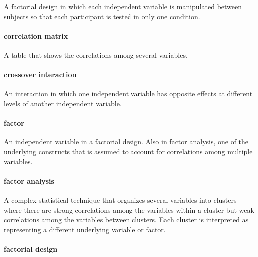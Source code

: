 \documentclass[
]{krantz}
\begin{document}
A factorial design in which each independent variable is manipulated between subjects so that each participant is tested in only one condition.

\hypertarget{correlation-matrix}{%
\paragraph*{correlation matrix}\label{correlation-matrix}}

A table that shows the correlations among several variables.

\hypertarget{crossover-interaction}{%
\paragraph*{crossover interaction}\label{crossover-interaction}}

An interaction in which one independent variable has opposite effects at different levels of another independent variable.

\hypertarget{factor}{%
\paragraph*{factor}\label{factor}}

An independent variable in a factorial design. Also in factor analysis, one of the underlying constructs that is assumed to account for correlations among multiple variables.

\hypertarget{factor-analysis}{%
\paragraph*{factor analysis}\label{factor-analysis}}

A complex statistical technique that organizes several variables into clusters where there are strong correlations among the variables within a cluster but weak correlations among the variables between clusters. Each cluster is interpreted as representing a different underlying variable or factor.

\hypertarget{factorial-design}{%
\paragraph*{factorial design}\label{factorial-design}}
\end{document}
